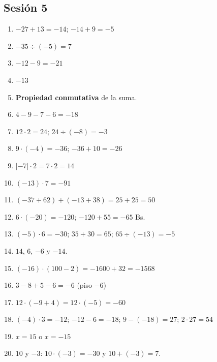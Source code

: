 \documentclass[12pt, letterpaper]{article}
\begin{document}
\subsection*{Sesión 5}
\begin{enumerate}[leftmargin=*, label=\textbf{\arabic*.}]
  \item $-27 + 13 = -14$; $-14 + 9 = -5$
  \item $-35 \div (-5) = 7$
  \item $-12 - 9 = -21$
  \item $-13$
  \item \textbf{Propiedad conmutativa} de la suma.
  \item $4 - 9 - 7 - 6 = -18$
  \item $12 \cdot 2 = 24$; $24 \div (-8) = -3$
  \item $9 \cdot (-4) = -36$; $-36 + 10 = -26$
  \item $|-7| \cdot 2 = 7 \cdot 2 = 14$
  \item $(-13) \cdot 7 = -91$
  \item $(-37 + 62) + (-13 + 38) = 25 + 25 = 50$
  \item $6 \cdot (-20) = -120$; $-120 + 55 = -65$ Bs.
  \item $(-5) \cdot 6 = -30$; $35 + 30 = 65$; $65 \div (-13) = -5$
  \item $14$, $6$, $-6$ y $-14$.
  \item $(-16) \cdot (100 - 2) = -1600 + 32 = -1568$
  \item $3 - 8 + 5 - 6 = -6$ (piso $-6$)
  \item $12 \cdot (-9 + 4) = 12 \cdot (-5) = -60$
  \item $(-4) \cdot 3 = -12$; $-12 - 6 = -18$; $9 - (-18) = 27$; $2 \cdot 27 = 54$
  \item $x = 15$ o $x = -15$
  \item $10$ y $-3$: $10 \cdot (-3) = -30$ y $10 + (-3) = 7$.
\end{enumerate}
\end{document}
